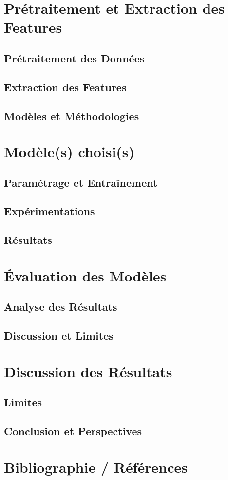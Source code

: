 \documentclass{rapport}
\begin{document}
\section{Prétraitement et Extraction des Features}
\subsection{Prétraitement des Données}
\subsection{Extraction des Features}
\subsection{Modèles et Méthodologies}

\section{Modèle(s) choisi(s)}
\subsection{Paramétrage et Entraînement}
\subsection{Expérimentations}
\subsection{Résultats}

\section{Évaluation des Modèles}
\subsection{Analyse des Résultats}
\subsection{Discussion et Limites}

\section{Discussion des Résultats}
\subsection{Limites}
\subsection{Conclusion et Perspectives}

\section{Bibliographie / Références}



\end{document}
